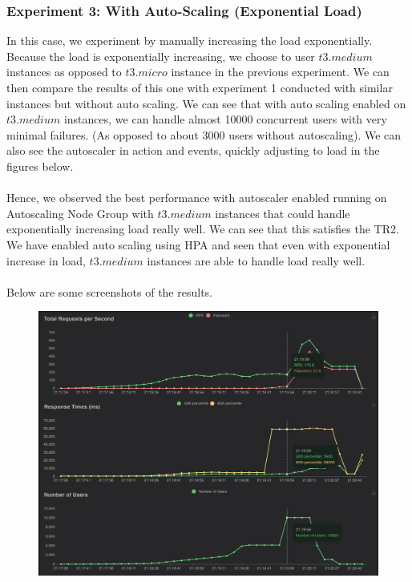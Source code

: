 \documentclass{article}
\begin{document}
\subsubsection{Experiment 3: With Auto-Scaling (Exponential Load)}
In this case, we experiment by manually increasing the load exponentially. Because the load is exponentially increasing, we choose to user $t3.medium$ instances as opposed to $t3.micro$ instance in the previous experiment. We can then compare the results of this one with experiment 1 conducted with similar instances but without auto scaling. We can see that with auto scaling enabled on $t3.medium$ instances, we can handle almost 10000 concurrent users with very minimal failures. (As opposed to about 3000 users without autoscaling). We can also see the autoscaler in action and events, quickly adjusting to load in the figures below. 
\\\\
Hence, we observed the best performance with autoscaler enabled running on Autoscaling Node Group with $t3.medium$ instances that could handle exponentially increasing load really well.  We can see that this satisfies the TR2. We have enabled auto scaling using HPA and seen that even with exponential increase in load, $t3.medium$ instances are able to handle load really well.  
\\\\
Below are some screenshots of the results. 
\begin{figure}[H]
    \centering
    \includegraphics[width=\linewidth]{images/exp3_results.png}
    \label{exp3}
\end{figure}
\end{document}
